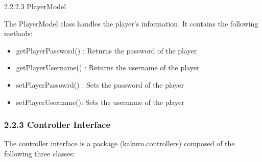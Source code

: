\documentclass[12pt]{article}
\begin{document}
2.2.2.3 PlayerModel\newline

The PlayerModel class handles the player’s information. It contains the following methods:\newline
\begin{itemize}
\item getPlayerPassword() : Returns the password of the player
\item getPlayerUsername() : Returns the username of the player
\item setPlayerPassowrd() : Sets the password of the player
\item setPlayerUsername(): Sets the username of the player\newline
\end{itemize}





\subsubsection{2.2.3 Controller Interface}

The controller interface is a package (kakuro.controllers) composed of the following three classes:\newline
\end{document}
